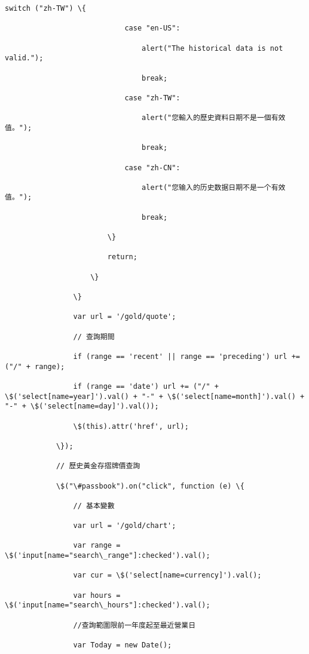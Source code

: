 \documentclass[11pt]{article}
\begin{document}
\begin{Verbatim}[commandchars=\\\{\}]
                        switch ("zh-TW") \{

                            case "en-US":

                                alert("The historical data is not valid.");

                                break;

                            case "zh-TW":

                                alert("您輸入的歷史資料日期不是一個有效值。");

                                break;

                            case "zh-CN":

                                alert("您输入的历史数据日期不是一个有效值。");

                                break;

                        \}

                        return;

                    \}

                \}

                var url = '/gold/quote';

                // 查詢期間

                if (range == 'recent' || range == 'preceding') url += ("/" + range);

                if (range == 'date') url += ("/" + \$('select[name=year]').val() + "-" + \$('select[name=month]').val() + "-" + \$('select[name=day]').val());

                \$(this).attr('href', url);

            \});

            // 歷史黃金存摺牌價查詢

            \$("\#passbook").on("click", function (e) \{

                // 基本變數

                var url = '/gold/chart';

                var range = \$('input[name="search\_range"]:checked').val();

                var cur = \$('select[name=currency]').val();

                var hours = \$('input[name="search\_hours"]:checked').val();

                //查詢範圍限前一年度起至最近營業日

                var Today = new Date();


\end{Verbatim}
\end{document}
